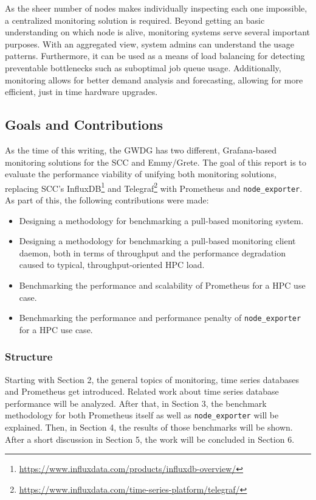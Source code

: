 As the sheer number of nodes makes individually inspecting each one impossible, a centralized
monitoring solution is required. Beyond getting an basic understanding on which node is alive, 
monitoring systems serve several important purposes. With an aggregated view, system admins can
understand the usage patterns. Furthermore, it can be used as a means of load balancing 
for detecting preventable bottlenecks such as suboptimal job queue usage. Additionally, monitoring
allows for better demand analysis and forecasting, allowing for more efficient, just in time 
hardware upgrades.

\subsection{Goals and Contributions}

As the time of this writing, the GWDG has two different, Grafana-based monitoring solutions for 
the \ac{SCC} and Emmy/Grete. The goal of this report is to evaluate the performance viability of
unifying both monitoring solutions, replacing \ac{SCC}'s InfluxDB\footnote{
\url{https://www.influxdata.com/products/influxdb-overview/}} and Telegraf\footnote{
\url{https://www.influxdata.com/time-series-platform/telegraf/}} with Prometheus and 
\texttt{node\_exporter}.
As part of this, the following contributions were made:
\begin{itemize}
\item Designing a methodology for benchmarking a pull-based monitoring system.
\item Designing a methodology for benchmarking a pull-based monitoring client daemon, both in 
terms of throughput and the performance degradation caused to typical, throughput-oriented 
\ac{HPC} load.
\item Benchmarking the performance and scalability of Prometheus for a \ac{HPC} use case.
\item Benchmarking the performance and performance penalty of \texttt{node\_exporter} for a 
\ac{HPC} use case.
\end{itemize}

\subsubsection{Structure}
Starting with Section 2, the general topics of monitoring, time series databases and
Prometheus get introduced. Related work about time series database performance will be analyzed.
After that, in Section 3, the benchmark methodology for both Prometheus itself as well as
\texttt{node\_exporter} will be explained. Then, in Section 4, the results of those benchmarks
will be shown. After a short discussion in Section 5, the work will be concluded in Section 6.

